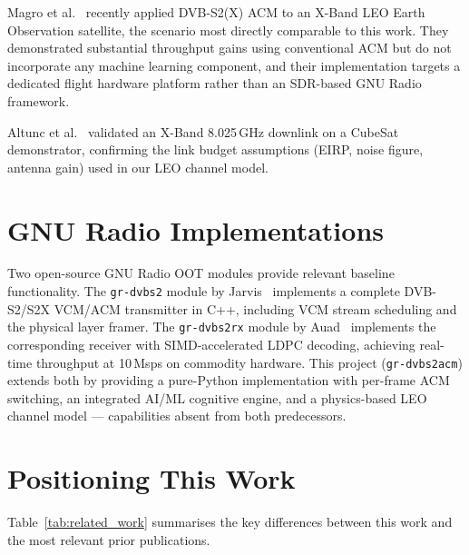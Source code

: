 \documentclass[12pt,a4paper]{report}
\begin{document}
Magro et al.~\cite{magro2025} recently applied DVB-S2(X) ACM to an X-Band LEO
Earth Observation satellite, the scenario most directly comparable to this work.
They demonstrated substantial throughput gains using conventional ACM but do not
incorporate any machine learning component, and their implementation targets a
dedicated flight hardware platform rather than an SDR-based GNU Radio framework.

Altunc et al.~\cite{altunc2015} validated an X-Band 8.025\,GHz downlink on a
CubeSat demonstrator, confirming the link budget assumptions (EIRP, noise figure,
antenna gain) used in our LEO channel model.

\section{GNU Radio Implementations}

Two open-source GNU Radio OOT modules provide relevant baseline functionality.
The \texttt{gr-dvbs2} module by Jarvis~\cite{gr_dvbs2} implements a complete
DVB-S2/S2X VCM/ACM transmitter in C++, including VCM stream scheduling and the
physical layer framer.  The \texttt{gr-dvbs2rx} module by Auad~\cite{gr_dvbs2rx}
implements the corresponding receiver with SIMD-accelerated LDPC decoding,
achieving real-time throughput at 10\,Msps on commodity hardware.  This project
(\texttt{gr-dvbs2acm}) extends both by providing a pure-Python implementation
with per-frame ACM switching, an integrated AI/ML cognitive engine, and a
physics-based LEO channel model --- capabilities absent from both predecessors.

\section{Positioning This Work}

Table~\ref{tab:related_work} summarises the key differences between this work
and the most relevant prior publications.
\end{document}
